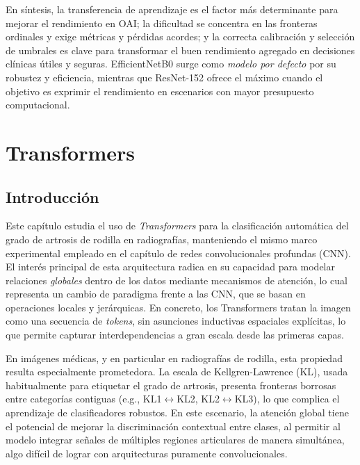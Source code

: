 \documentclass[11pt,spanish,listoffigures,listoftables]{tfgetsinf}
\begin{document}
En síntesis, la transferencia de aprendizaje es el factor más determinante para mejorar el rendimiento en OAI; la dificultad se concentra en las fronteras ordinales y exige métricas y pérdidas acordes; y la correcta calibración y selección de umbrales es clave para transformar el buen rendimiento agregado en decisiones clínicas útiles y seguras. EfficientNetB0 surge como \emph{modelo por defecto} por su robustez y eficiencia, mientras que ResNet-152 ofrece el máximo cuando el objetivo es exprimir el rendimiento en escenarios con mayor presupuesto computacional.


\chapter{Transformers}
\label{chap:transformers}

\section{Introducción}
Este capítulo estudia el uso de \emph{Transformers} para la clasificación automática del grado de artrosis de rodilla en radiografías, manteniendo el mismo marco experimental empleado en el capítulo de redes convolucionales profundas (CNN). El interés principal de esta arquitectura radica en su capacidad para modelar relaciones \emph{globales} dentro de los datos mediante mecanismos de atención, lo cual representa un cambio de paradigma frente a las CNN, que se basan en operaciones locales y jerárquicas. En concreto, los Transformers tratan la imagen como una secuencia de \emph{tokens}, sin asunciones inductivas espaciales explícitas, lo que permite capturar interdependencias a gran escala desde las primeras capas.

En imágenes médicas, y en particular en radiografías de rodilla, esta propiedad resulta especialmente prometedora. La escala de Kellgren-Lawrence (KL), usada habitualmente para etiquetar el grado de artrosis, presenta fronteras borrosas entre categorías contiguas (e.g., KL1$\leftrightarrow$KL2, KL2$\leftrightarrow$KL3), lo que complica el aprendizaje de clasificadores robustos. En este escenario, la atención global tiene el potencial de mejorar la discriminación contextual entre clases, al permitir al modelo integrar señales de múltiples regiones articulares de manera simultánea, algo difícil de lograr con arquitecturas puramente convolucionales.
\end{document}
